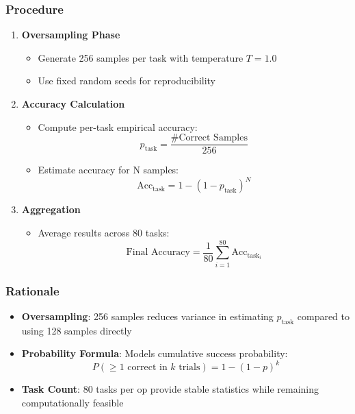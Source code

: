 \subsubsection{Procedure}
\begin{enumerate}
    \item \textbf{Oversampling Phase}
    \begin{itemize}
        \item Generate 256 samples per task with temperature $T=1.0$
        \item Use fixed random seeds for reproducibility
    \end{itemize}
    
    \item \textbf{Accuracy Calculation}
    \begin{itemize}
        \item Compute per-task empirical accuracy:
        \begin{equation}
            p_{\text{task}} = \frac{\text{\# Correct Samples}}{256}
        \end{equation}
        
        \item Estimate accuracy for N samples:
        \begin{equation}
            \text{Acc}_{\text{task}} = 1 - (1 - p_{\text{task}})^{N}
        \end{equation}
    \end{itemize}
    
    \item \textbf{Aggregation}
    \begin{itemize}
        \item Average results across 80 tasks:
        \begin{equation}
            \text{Final Accuracy} = \frac{1}{80} \sum_{i=1}^{80} \text{Acc}_{\text{task}_i}
        \end{equation}
    \end{itemize}
\end{enumerate}

\subsubsection{Rationale}
\begin{itemize}
    \item \textbf{Oversampling}: 256 samples reduces variance in estimating $p_{\text{task}}$ compared to using 128 samples directly
    \item \textbf{Probability Formula}: Models cumulative success probability:
    \begin{equation*}
        P(\geq\text{1 correct in }k\text{ trials}) = 1 - (1 - p)^k
    \end{equation*}
    \item \textbf{Task Count}: 80 tasks per op provide stable statistics while remaining computationally feasible
\end{itemize}

